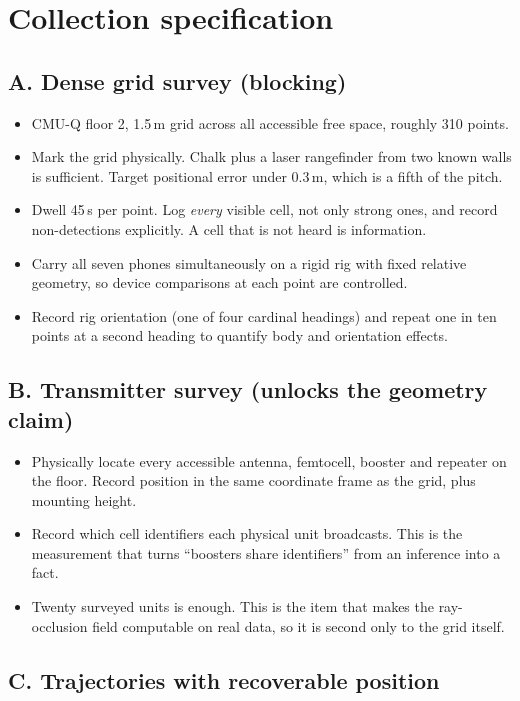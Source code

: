 \documentclass[10pt,a4paper]{article}
\begin{document}
\section{Collection specification}

\subsection{A. Dense grid survey (blocking)}

\begin{itemize}
\item CMU-Q floor 2, 1.5\,m grid across all accessible free space, roughly 310 points.
\item Mark the grid physically. Chalk plus a laser rangefinder from two known walls is
sufficient. Target positional error under 0.3\,m, which is a fifth of the pitch.
\item Dwell 45\,s per point. Log \emph{every} visible cell, not only strong ones, and
record non-detections explicitly. A cell that is not heard is information.
\item Carry all seven phones simultaneously on a rigid rig with fixed relative geometry,
so device comparisons at each point are controlled.
\item Record rig orientation (one of four cardinal headings) and repeat one in ten points
at a second heading to quantify body and orientation effects.
\end{itemize}

\subsection{B. Transmitter survey (unlocks the geometry claim)}

\begin{itemize}
\item Physically locate every accessible antenna, femtocell, booster and repeater on the
floor. Record position in the same coordinate frame as the grid, plus mounting height.
\item Record which cell identifiers each physical unit broadcasts. This is the
measurement that turns ``boosters share identifiers'' from an inference into a fact.
\item Twenty surveyed units is enough. This is the item that makes the ray-occlusion
field computable on real data, so it is second only to the grid itself.
\end{itemize}

\subsection{C. Trajectories with recoverable position}
\end{document}
